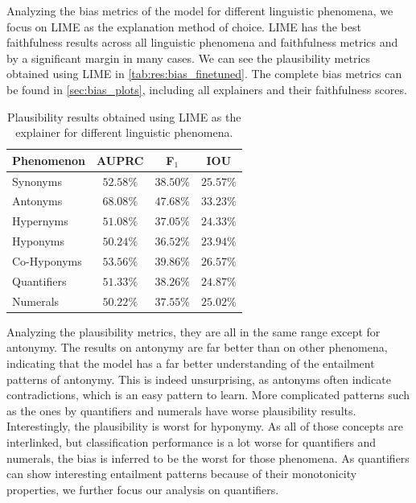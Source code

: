 Analyzing the bias metrics of the model for different linguistic phenomena, we focus on \ac{LIME} as the explanation method of choice. \ac{LIME} has the best faithfulness results across all linguistic phenomena and faithfulness metrics and by a significant margin in many cases. We can see the plausibility metrics obtained using \ac{LIME} in \autoref{tab:res:bias_finetuned}. The complete bias metrics can be found in \autoref{sec:bias_plots}, including all explainers and their faithfulness scores.

\begin{table}[ht!]
    \centering
    \caption{Plausibility results obtained using \ac{LIME} as the explainer for different linguistic phenomena.}
    \begin{tabular}{l c c c}
        \toprule
        \multicolumn{1}{c}{Phenomenon} & \acs{AUPRC} & F$_1$ & \acs{IOU}\\
        \midrule
        Synonyms & $52.58\%$ & $38.50\%$ & $25.57\%$ \\
        Antonyms & $68.08\%$ & $47.68\%$ & $33.23\%$ \\
        Hypernyms & $51.08\%$ & $37.05\%$ & $24.33\%$ \\
        Hyponyms & $50.24\%$ & $36.52\%$ & $23.94\%$ \\
        Co-Hyponyms & $53.56\%$ & $39.86\%$ & $26.57\%$ \\
        Quantifiers & $51.33\%$ & $38.26\%$ & $24.87\%$ \\
        Numerals & $50.22\%$ & $37.55\%$ & $25.02\%$ \\
        \bottomrule
    \end{tabular}
    \label{tab:res:bias_finetuned}
\end{table}

Analyzing the plausibility metrics, they are all in the same range except for antonymy. The results on antonymy are far better than on other phenomena, indicating that the model has a far better understanding of the entailment patterns of antonymy. This is indeed unsurprising, as antonyms often indicate contradictions, which is an easy pattern to learn. More complicated patterns such as the ones by quantifiers and numerals have worse plausibility results. Interestingly, the plausibility is worst for hyponymy. As all of those concepts are interlinked, but classification performance is a lot worse for quantifiers and numerals, the bias is inferred to be the worst for those phenomena. As quantifiers can show interesting entailment patterns because of their monotonicity properties, we further focus our analysis on quantifiers.

